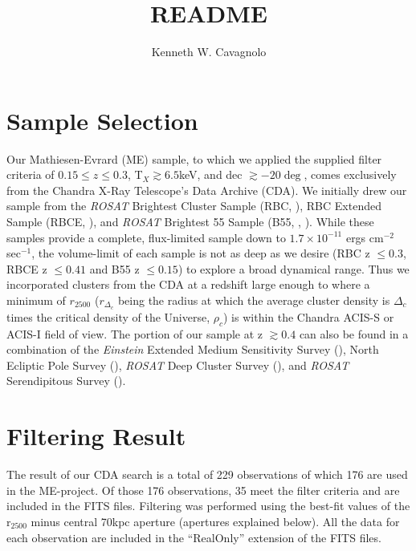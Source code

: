 \documentclass[preprint]{aastex}
\begin{document}
\title{README}
\author{Kenneth W. Cavagnolo}

\section{Sample Selection}

Our Mathiesen-Evrard (ME) sample, to which we applied the supplied
filter criteria of $0.15 \leq z \leq 0.3$, T$_X \gtrsim 6.5$keV, and
dec $\gtrsim -20\deg$, comes exclusively from the Chandra X-Ray
Telescope's Data Archive (CDA). We initially drew our sample from the
{\textit{ROSAT}} Brightest Cluster Sample (RBC,
\cite{1998MNRAS.301..881E}), RBC Extended Sample (RBCE,
\cite{2000MNRAS.318..333E}), and {\textit{ROSAT}} Brightest 55 Sample
(B55, \cite{1990MNRAS.245..559E}, \cite{1998MNRAS.298..416P}). While
these samples provide a complete, flux-limited sample down to
$1.7\times10^{-11}$ ergs cm$^{-2}$ sec$^{-1}$, the volume-limit of each
sample is not as deep as we desire (RBC z $\leq 0.3$, RBCE z
$\leq 0.41$ and B55 z $\leq 0.15$) to explore a broad dynamical
range. Thus we incorporated clusters from the CDA at a redshift large enough
to where a minimum of $r_{2500}$ ($r_{\Delta_c}$ being the radius at which the
average cluster density is $\Delta_c$ times the critical density of the
Universe, $\rho_c$) is within the Chandra ACIS-S or ACIS-I field of
view. The portion of our sample at z $\gtrsim 0.4$ can also be found in a
combination of the {\textit{Einstein}} Extended Medium Sensitivity Survey
(\cite{1990ApJS...72..567G}), North Ecliptic Pole Survey
(\cite{2006ApJS..162..304H}), {\textit{ROSAT}} Deep Cluster Survey
(\cite{1995ApJ...445L..11R}), and {\textit{ROSAT}} Serendipitous Survey
(\cite{1998ApJ...502..558V}).

\section{Filtering Result}

The result of our CDA search is a total of 229 observations of which
176 are used in the ME-project. Of those 176 observations, 35 meet the
filter criteria and are included in the FITS files. Filtering was
performed using the best-fit values of the r$_{2500}$ minus central
70kpc aperture (apertures explained below). All the data for each
observation are included in the ``RealOnly'' extension of the FITS files.
\end{document}
